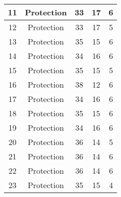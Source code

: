 \documentclass[results.tex]{subfiles}
\begin{document}
\begin{center}
\begin{tabular}{| c || c | c | c | c |}
            \hline
            11                      & Protection                   & 33                     & 17                      & 6                    \\
            \hline
            12                      & Protection                   & 33                     & 17                      & 5                    \\
            \hline
            13                      & Protection                   & 35                     & 15                      & 6                    \\
            \hline
            14                      & Protection                   & 34                     & 16                      & 6                    \\
            \hline
            15                      & Protection                   & 35                     & 15                      & 5                    \\
            \hline
            16                      & Protection                   & 38                     & 12                      & 6                    \\
            \hline
            17                      & Protection                   & 34                     & 16                      & 6                    \\
            \hline
            18                      & Protection                   & 35                     & 15                      & 6                    \\
            \hline
            19                      & Protection                   & 34                     & 16                      & 6                    \\
            \hline
            20                      & Protection                   & 36                     & 14                      & 5                    \\
            \hline
            21                      & Protection                   & 36                     & 14                      & 6                    \\
            \hline
            22                      & Protection                   & 36                     & 14                      & 6                    \\
            \hline
            23                      & Protection                   & 35                     & 15                      & 4                    \\

\end{tabular}
\end{center}
\end{document}
